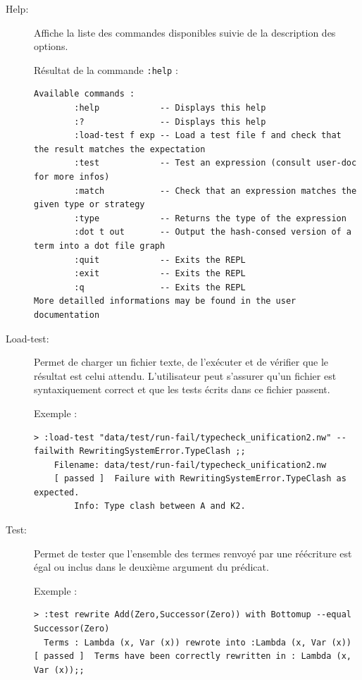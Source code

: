 \documentclass[12pt,a4paper]{article}
\begin{document}
\begin{description}

\item[Help:]
Affiche la liste des commandes disponibles suivie de la description des options.

\begin{minipage}{\textwidth}
Résultat de la commande \verb=:help= :
\begin{lstlisting}[breaklines=true,basicstyle=\ttfamily\footnotesize]
Available commands :
        :help            -- Displays this help
        :?               -- Displays this help
        :load-test f exp -- Load a test file f and check that the result matches the expectation
        :test            -- Test an expression (consult user-doc for more infos)
        :match           -- Check that an expression matches the given type or strategy
        :type            -- Returns the type of the expression
        :dot t out       -- Output the hash-consed version of a term into a dot file graph
        :quit            -- Exits the REPL
        :exit            -- Exits the REPL
        :q               -- Exits the REPL
More detailled informations may be found in the user documentation
\end{lstlisting}
\end{minipage}

\item[Load-test:]
Permet de charger un fichier texte, de l'exécuter et de vérifier que le résultat est celui attendu. L'utilisateur peut s'assurer qu'un fichier est syntaxiquement correct et que les tests écrits dans ce fichier passent.

\begin{minipage}{\textwidth}
Exemple :
\begin{lstlisting}[breaklines=true,basicstyle=\ttfamily\footnotesize]
> :load-test "data/test/run-fail/typecheck_unification2.nw" --failwith RewritingSystemError.TypeClash ;;
    Filename: data/test/run-fail/typecheck_unification2.nw
    [ passed ]  Failure with RewritingSystemError.TypeClash as expected.
        Info: Type clash between A and K2.
\end{lstlisting}
\end{minipage}

\item[Test:]
Permet de tester que l'ensemble des termes renvoyé par une réécriture est égal ou inclus dans le deuxième argument du prédicat.\\

 \begin{minipage}{\textwidth}
Exemple :
\begin{lstlisting}[breaklines=true,basicstyle=\ttfamily\footnotesize]
> :test rewrite Add(Zero,Successor(Zero)) with Bottomup --equal Successor(Zero)
  Terms : Lambda (x, Var (x)) rewrote into :Lambda (x, Var (x))
[ passed ]  Terms have been correctly rewritten in : Lambda (x, Var (x));;
\end{lstlisting}
\end{minipage}


\end{description}
\end{document}
